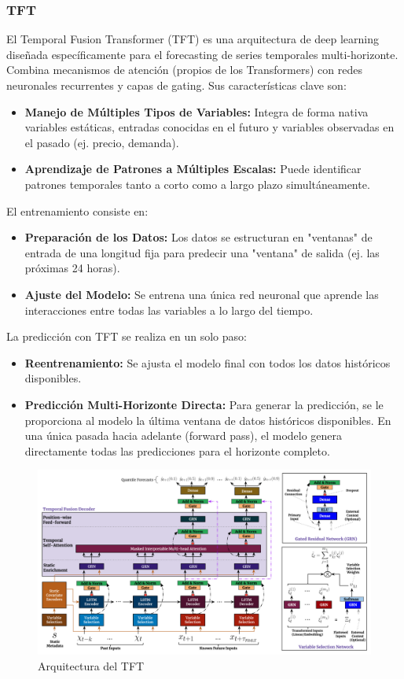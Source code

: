 \subsubsection{TFT}
%
%
%
El Temporal Fusion Transformer (TFT) es una arquitectura de deep learning diseñada específicamente para el forecasting de series temporales multi-horizonte. Combina mecanismos de atención (propios de los Transformers) con redes neuronales recurrentes y capas de gating. Sus características clave son:

\begin{itemize}
    \item \textbf{Manejo de Múltiples Tipos de Variables:} Integra de forma nativa variables estáticas, entradas conocidas en el futuro y variables observadas en el pasado (ej. precio, demanda).
    \item \textbf{Aprendizaje de Patrones a Múltiples Escalas:} Puede identificar patrones temporales tanto a corto como a largo plazo simultáneamente.
\end{itemize}
%
%
%
El entrenamiento consiste en:
%
%
%
\begin{itemize}
    \item \textbf{Preparación de los Datos:} Los datos se estructuran en "ventanas" de entrada de una longitud fija para predecir una "ventana" de salida (ej. las próximas 24 horas).
    \item \textbf{Ajuste del Modelo:} Se entrena una única red neuronal que aprende las interacciones entre todas las variables a lo largo del tiempo.
\end{itemize}
%
%
%
La predicción con TFT se realiza en un solo paso:
%
%
%
\begin{itemize}
    \item \textbf{Reentrenamiento:} Se ajusta el modelo final con todos los datos históricos disponibles.
    \item \textbf{Predicción Multi-Horizonte Directa:} Para generar la predicción, se le proporciona al modelo la última ventana de datos históricos disponibles. En una única pasada hacia adelante (forward pass), el modelo genera directamente todas las predicciones para el horizonte completo.
\end{itemize}
%
%
%
\begin{figure}[H]
    \centering
    \includegraphics[width=0.7\linewidth]{figuras/TFTarquitectura.png}
    \caption[Arquitectura de TFT]{Arquitectura del TFT \cite{TFT}}
    \label{fig:placeholder}
\end{figure}
